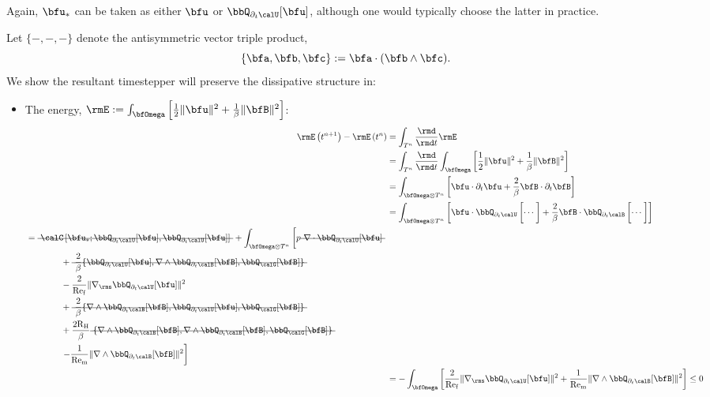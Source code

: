     Again, $\bfu_{*}$ can be taken as either $\bfu$ or $\bbQ_{\partial_{t}\calU}[\bfu]$, although one would typically choose the latter in practice.

    \shortline

    Let $\{-, -, -\}$ denote the antisymmetric vector triple product,
    \begin{equation}
        \{\bfa, \bfb, \bfc\}  :=  \bfa\cdot(\bfb\wedge\bfc).
    \end{equation}
    We show the resultant timestepper will preserve the dissipative structure in:
    \begin{itemize}
        \item  The energy, $\rmE  :=  \int_{\bfOmega}\left[\frac{1}{2}\|\bfu\|^{2} + \frac{1}{\beta}\|\bfB\|^{2}\right]$:
        \begin{align}
                \rmE\left(t^{n + 1}\right) - \rmE\left(t^{n}\right)
                &=  \int_{T^{n}}\frac{\rmd}{\rmd t}\rmE  \\
                &=  \int_{T^{n}}\frac{\rmd}{\rmd t}\int_{\bfOmega}\left[\frac{1}{2}\|\bfu\|^{2} + \frac{1}{\beta}\|\bfB\|^{2}\right]  \\
                &=  \int_{\bfOmega\otimes T^{n}}\left[\bfu\cdot\partial_{t}\bfu + \frac{2}{\beta}\bfB\cdot\partial_{t}\bfB\right]  \\
                &=  \int_{\bfOmega\otimes T^{n}}\left[\bfu\cdot\bbQ_{\partial_{t}\calU}\left[\cdots\tall\right] + \frac{2}{\beta}\bfB\cdot\bbQ_{\partial_{t}\calB}\left[\cdots\tall\right]\right]  \\
            \begin{split}
                &=  \mst{\calC\left[\bfu_{*}; \bbQ_{\partial_{t}\calU}[\bfu], \bbQ_{\partial_{t}\calU}[\bfu]\right]} + \int_{\bfOmega\otimes T^{n}}\left[p\mst{\nabla\cdot\bbQ_{\partial_{t}\calU}[\bfu]}\tall\right.  \\
                &\qquad\qquad+ \mst{\frac{2}{\beta}\{\bbQ_{\partial_{t}\calU}[\bfu], \nabla\wedge\bbQ_{\partial_{t}\calB}[\bfB], \bbQ_{\calG}[\bfB]\}}  \\
                &\qquad\qquad- \frac{2}{\rmRef}\|\nabla_{\rms}\bbQ_{\partial_{t}\calU}[\bfu]\|^{2}  \\
                &\qquad\qquad+ \mst{\frac{2}{\beta}\{\nabla\wedge\bbQ_{\partial_{t}\calB}[\bfB], \bbQ_{\partial_{t}\calU}[\bfu], \bbQ_{\calG}[\bfB]\}}  \\
                &\qquad\qquad+ \frac{2\rmRH}{\beta}\mst{\{\nabla\wedge\bbQ_{\partial_{t}\calB}[\bfB], \nabla\wedge\bbQ_{\partial_{t}\calB}[\bfB], \bbQ_{\calG}[\bfB]\}}  \\
                &\qquad\qquad\left.- \frac{1}{\rmRem}\|\nabla\wedge\bbQ_{\partial_{t}\calB}[\bfB]\|^{2}\right]
            \end{split}  \\
                &=  - \int_{\bfOmega}\left[\frac{2}{\rmRef}\|\nabla_{\rms}\bbQ_{\partial_{t}\calU}[\bfu]\|^{2} + \frac{1}{\rmRem}\|\nabla\wedge\bbQ_{\partial_{t}\calB}[\bfB]\|^{2}\right]  \leq  0
        \end{align}
        

\end{itemize}
